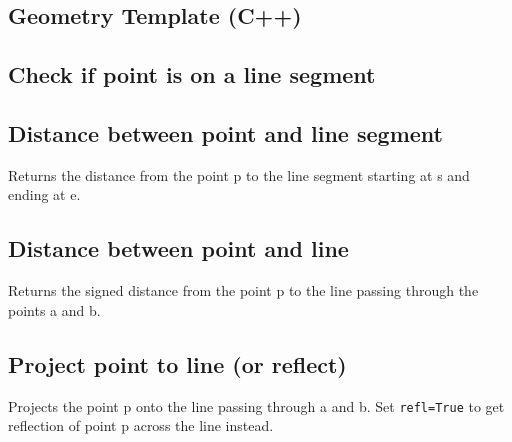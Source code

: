 \documentclass{article}
\begin{document}
\subsection*{Geometry Template (C++)}


\subsection*{Check if point is on a line segment}



\subsection*{Distance between point and line segment}
Returns the distance from the point p to the line segment starting at s and ending at e.
\begin{multicols}{2}
  
  \columnbreak
  
\end{multicols}

\pagebreak

\subsection*{Distance between point and line}
Returns the signed distance from the point p to the line passing through the points a and b.
\begin{multicols}{2}
  
  \columnbreak
  
\end{multicols}

\subsection*{Project point to line (or reflect)}
Projects the point p onto the line passing through a and b.
Set \lstinline{refl=True} to get reflection of point p across the line instead.
\begin{multicols}{2}
  
  \columnbreak
  
\end{multicols}
\end{document}
